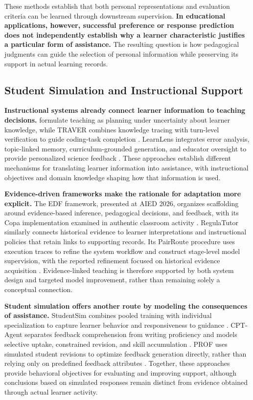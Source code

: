 These methods establish that both personal representations and evaluation criteria can be learned through downstream supervision. \textbf{In educational applications, however, successful preference or response prediction does not independently establish why a learner characteristic justifies a particular form of assistance.} The resulting question is how pedagogical judgments can guide the selection of personal information while preserving its support in actual learning records.

\subsection{Student Simulation and Instructional Support}

\textbf{Instructional systems already connect learner information to teaching decisions.} \citet{rafferty2016pomdp} formulate teaching as planning under uncertainty about learner knowledge, while TRAVER combines knowledge tracing with turn-level verification to guide coding-task completion \citep{wang2025traver}. LearnLens integrates error analysis, topic-linked memory, curriculum-grounded generation, and educator oversight to provide personalized science feedback \citep{zhao2025learnlens}. These approaches establish different mechanisms for translating learner information into assistance, with instructional objectives and domain knowledge shaping how that information is used.

\textbf{Evidence-driven frameworks make the rationale for adaptation more explicit.} The EDF framework, presented at AIED 2026, organizes scaffolding around evidence-based inference, pedagogical decisions, and feedback, with its Copa implementation examined in authentic classroom activity \citep{cohn2026edf}. RegulaTutor similarly connects historical evidence to learner interpretations and instructional policies that retain links to supporting records. Its PairRoute procedure uses execution traces to refine the system workflow and construct stage-level model supervision, with the reported refinement focused on historical evidence acquisition \citep{li2026regulatutor}. Evidence-linked teaching is therefore supported by both system design and targeted model improvement, rather than remaining solely a conceptual connection.

\textbf{Student simulation offers another route by modeling the consequences of assistance.} StudentSim combines pooled training with individual specialization to capture learner behavior and responsiveness to guidance \citep{yang2026simulator}. CPT-Agent separates feedback comprehension from writing proficiency and models selective uptake, constrained revision, and skill accumulation \citep{chen2026cptagent}. PROF uses simulated student revisions to optimize feedback generation directly, rather than relying only on predefined feedback attributes \citep{nair2024prof}. Together, these approaches provide behavioral objectives for evaluating and improving support, although conclusions based on simulated responses remain distinct from evidence obtained through actual learner activity.

